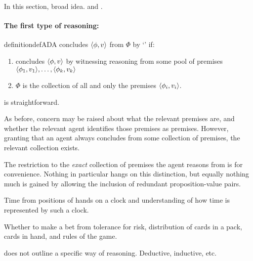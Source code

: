 \begin{note}
  In this section, broad idea.
  \adA{} and \adB{}.
\end{note}

\paragraph*{The first type of reasoning: \adA{}}

\begin{note}
  \begin{restatable}[\adA{}]{definition}{defADA}
    \label{AR:adA}
    \label{def:adA}
    \vAgent{} concludes \(\langle \phi, v \rangle\) from \(\Phi\) by `\adA{}' if:
    \begin{enumerate}[label=\textsf{S:\arabic*}., ref=(\textsf{S}:\arabic*)]
    \item
      \label{def:adA:psi}
      \vAgent{} concludes \(\langle \phi, v \rangle\) by witnessing reasoning from some pool of premises \(\langle \phi_{1}, v_{1} \rangle,\dots,\langle \phi_{k}, v_{k} \rangle\)
    \item
      \(\Phi\) is the collection of all and only the premises \(\langle \phi_{i}, v_{i} \rangle\).
    \end{enumerate}
    \vspace{-\baselineskip}
  \end{restatable}

  \adA{} is straightforward.

  As before, concern may be raised about what the relevant premises are, and whether the relevant agent identifies those premises as premises.
  However, granting that an agent always concludes from some collection of premises, the relevant collection exists.

  The restriction to the \emph{exact} collection of premises the agent reasons from is for convenience.
  Nothing in particular hangs on this distinction, but equally nothing much is gained by allowing the inclusion of redundant proposition-value pairs.
\end{note}

\begin{note}[\illu{1}]
  Time from positions of hands on a clock and understanding of how time is represented by such a clock.

  Whether to make a bet from tolerance for risk, distribution of cards in a pack, cards in hand, and rules of the game.
\end{note}

\begin{note}
  \adA{} does not outline a specific way of reasoning.
  Deductive, inductive, etc.\
\end{note}


